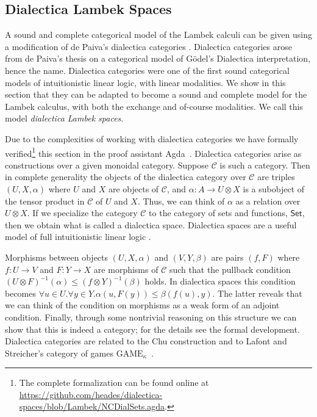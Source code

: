 \documentclass{lmcs}
\let\mto\to                     %
\let\to\relax                   %
\newcommand{\to}{\rightarrow}
\newcommand{\cat}[1]{\mathcal{#1}}
\newcommand{\Set}{\mathsf{Set}}
\begin{document}
\subsection{Dialectica Lambek Spaces}
\label{sec:dialectica_lambek_spaces}

A sound and complete categorical model of  the Lambek calculi
 can be given using a modification of de Paiva's
dialectica categories \cite{depaiva1990}.  Dialectica
categories arose from de Paiva's thesis on a categorical model
of G\"odel's Dialectica interpretation, hence the name.  Dialectica
categories were one of the first sound categorical models of
intuitionistic linear logic, with  linear modalities.  We show in
this section that they can be adapted to become a sound and complete model for the Lambek calculus, with both the
exchange and of-course modalities. We call this model  \textit{dialectica Lambek spaces}.

Due to the complexities of working
with dialectica categories we have formally verified\footnote{The complete formalization can be
  found online at
  \url{https://github.com/heades/dialectica-spaces/blob/Lambek/NCDialSets.agda}.} this section in
the proof assistant Agda~\cite{bove2009}.
Dialectica categories arise as constructions over a given monoidal
category.  Suppose $\cat{C}$ is such a category.  Then in complete
generality the objects of the dialectica category over $\cat{C}$ are
triples $(U, X, \alpha)$ where $U$ and $X$ are objects of $\cat{C}$,
and $\alpha : A \mto U \otimes X$ is a subobject of the tensor product
in $\cat{C}$ of $U$ and $X$.  Thus, we can think of $\alpha$ as a
relation over $U \otimes X$.  If we specialize the category $\cat{C}$
to the category of sets and functions, $\Set$, then we obtain what is
called a dialectica space. Dialectica spaces are a useful model of
full intuitionistic linear logic \cite{Hyland:1993}.

Morphisms between objects $(U, X, \alpha)$ and $(V, Y, \beta)$ are
pairs $(f, F)$ where $f : U \mto V$ and $F : Y \mto X$ are morphisms
of $\cat{C}$ such that the pullback condition 
$(U \otimes F)^{-1}(\alpha) \leq (f \otimes Y)^{-1}(\beta)$ holds.
In dialectica spaces this condition becomes
$\forall u \in U.\forall y \in Y. \alpha(u , F(y)) \leq \beta(f(u), y)$.
The latter reveals that we can think of the condition on morphisms as
a weak form of an adjoint condition.  Finally, through some nontrivial reasoning
on this structure we can show that this is indeed a category; for the
details see the formal development.  Dialectica categories are related
to the Chu construction \cite{depaiva2007} and to Lafont and Streicher's category of games $\text{GAME}_{\kappa}$~\cite{lafont1991}.
\end{document}
